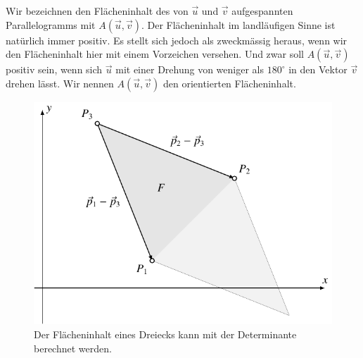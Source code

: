 Wir bezeichnen den Flächeninhalt des von $\vec u$ und $\vec v$ aufgespannten
Parallelogramms mit $A(\vec u,\vec v)$.
Der Flächeninhalt im landläufigen
Sinne ist natürlich immer positiv.
Es stellt sich jedoch als
zweckmässig heraus, wenn wir den Flächeninhalt hier mit einem
Vorzeichen versehen.
Und zwar soll $A(\vec u,\vec v)$ positiv sein, wenn
sich $\vec u$ mit einer Drehung von weniger als $180^\circ$ in den Vektor
$\vec v$ drehen lässt.
Wir nennen $A(\vec u, \vec v)$ den orientierten
Flächeninhalt.

\begin{figure}
\centering
\includegraphics{5/images/dreieck.pdf}
\caption{Der Flächeninhalt eines Dreiecks kann mit der Determinante
berechnet werden.
\label{skript:dreiecksflaeche}}
\end{figure}


